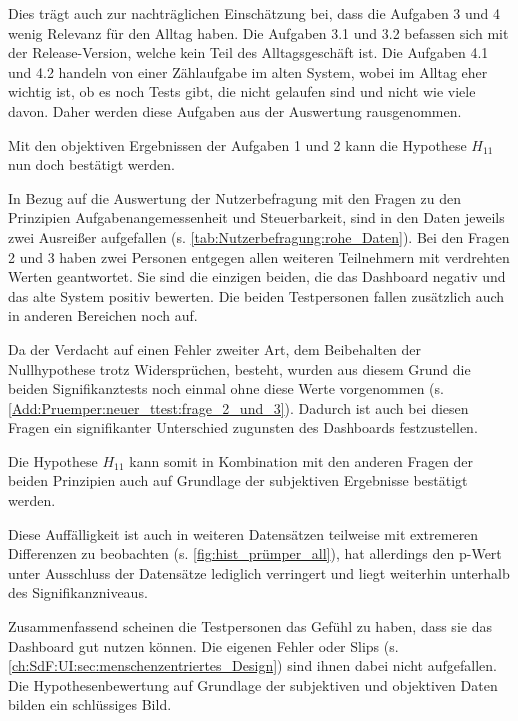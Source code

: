 Dies trägt auch zur nachträglichen Einschätzung bei, dass die Aufgaben 3 und 4 wenig Relevanz für den Alltag haben. Die Aufgaben 3.1 und 3.2 befassen sich mit der Release-Version, welche kein Teil des Alltagsgeschäft ist. Die Aufgaben 4.1 und 4.2 handeln von einer Zählaufgabe im alten System, wobei im Alltag eher wichtig ist, ob es noch Tests gibt, die nicht gelaufen sind und nicht wie viele davon. Daher werden diese Aufgaben aus der Auswertung rausgenommen.

Mit den objektiven Ergebnissen der Aufgaben 1 und 2 kann die Hypothese $H_{11}$ nun doch bestätigt werden.

In Bezug auf die Auswertung der Nutzerbefragung mit den Fragen zu den Prinzipien Aufgabenangemessenheit und Steuerbarkeit, sind in den Daten jeweils zwei Ausreißer aufgefallen (s. \autoref{tab:Nutzerbefragung:rohe_Daten}).
Bei den Fragen 2 und 3 haben zwei Personen entgegen allen weiteren Teilnehmern mit verdrehten Werten geantwortet. Sie sind die einzigen beiden, die das Dash\-board negativ und das alte System positiv bewerten. Die beiden Testpersonen fallen zusätzlich auch in anderen Bereichen noch auf.

Da der Verdacht auf einen Fehler zweiter Art, dem Beibehalten der Nullhypothese trotz Widersprüchen, besteht, wurden aus diesem Grund die beiden Signifikanztests noch einmal ohne diese Werte vorgenommen (s. \autoref{Add:Pruemper:neuer_ttest:frage_2_und_3}). Dadurch ist auch bei diesen Fragen ein signifikanter Unterschied zugunsten des Dash\-boards festzustellen.

Die Hypothese $H_{11}$ kann somit in Kombination mit den anderen Fragen der beiden Prinzipien auch auf Grundlage der subjektiven Ergebnisse bestätigt werden.

Diese Auffälligkeit ist auch in weiteren Datensätzen teilweise mit extremeren Differenzen zu beobachten (s. \autoref{fig:hist_prümper_all}), hat allerdings den p-Wert unter Ausschluss der Datensätze lediglich verringert und liegt weiterhin unterhalb des Signifikanzniveaus.

Zusammenfassend scheinen die Testpersonen das Gefühl zu haben, dass sie das Dash\-board gut nutzen können. Die eigenen Fehler oder Slips (s. \autoref{ch:SdF:UI:sec:menschenzentriertes_Design}) sind ihnen dabei nicht aufgefallen. Die Hypothesenbewertung auf Grundlage der subjektiven und objektiven Daten bilden ein schlüssiges Bild.
